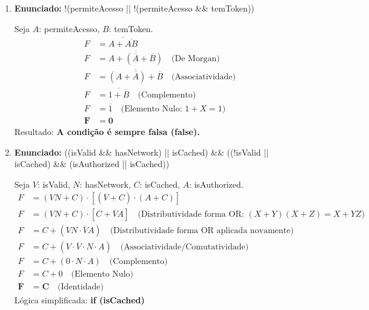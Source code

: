 \documentclass[12pt]{article}
\begin{document}
\begin{enumerate}[label=\textbf{\arabic*.}]
\item \textbf{Enunciado:} !(permiteAcesso || !(permiteAcesso \&\& temToken))
\begin{solucao}
Seja $A$: permiteAcesso, $B$: temToken.
\begin{align*}
    F &= \overline{A + \overline{AB}} \\
    F &= \overline{A + (\overline{A} + \overline{B})} \quad \text{(De Morgan)} \\
    F &= \overline{(A + \overline{A}) + \overline{B}} \quad \text{(Associatividade)} \\
    F &= \overline{1 + \overline{B}} \quad \text{(Complemento)} \\
    F &= \overline{1} \quad \text{(Elemento Nulo: } 1+X=1) \\
    \mathbf{F} &= \mathbf{0}
\end{align*}
Resultado: \textbf{A condição é sempre falsa (false).}
\end{solucao}

\item \textbf{Enunciado:} ((isValid \&\& hasNetwork) || isCached) \&\& ((!isValid || isCached) \&\& (isAuthorized || isCached))
\begin{solucao}
Seja $V$: isValid, $N$: hasNetwork, $C$: isCached, $A$: isAuthorized.
\begin{align*}
    F &= (VN + C) \cdot [(\overline{V} + C) \cdot (A + C)] \\
    F &= (VN + C) \cdot [C + \overline{V}A] \quad \text{(Distributividade forma OR: } (X+Y)(X+Z)=X+YZ) \\
    F &= C + (VN \cdot \overline{V}A) \quad \text{(Distributividade forma OR aplicada novamente)} \\
    F &= C + (V \cdot \overline{V} \cdot N \cdot A) \quad \text{(Associatividade/Comutatividade)} \\
    F &= C + (0 \cdot N \cdot A) \quad \text{(Complemento)} \\
    F &= C + 0 \quad \text{(Elemento Nulo)} \\
    \mathbf{F} &= \mathbf{C} \quad \text{(Identidade)}
\end{align*}
Lógica simplificada: \textbf{if (isCached)}
\end{solucao}


\end{enumerate}
\end{document}
